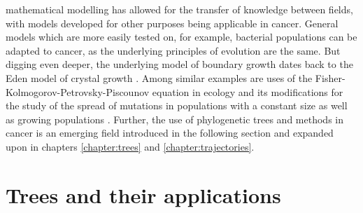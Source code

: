 mathematical modelling has allowed for the transfer of knowledge between fields, with models developed for
other purposes being applicable in cancer. General models which are more easily tested on, for example, bacterial
populations \cite{fusco_excess_2016, schreck_impact_2023} can be adapted to cancer, as the underlying principles
of evolution are the same. But digging even deeper, the underlying model of boundary growth dates back to the
Eden model of crystal growth \cite{eden_two-dimensional_1961}. Among similar examples are uses of the
Fisher-Kolmogorov-Petrovsky-Piscounov equation in ecology and its modifications for the study of the spread
of mutations in populations with a constant size \cite{houchmandzadeh_fisher_2017} as well as growing populations
\cite{wodarz_mutant_2020}.
Further, the use of phylogenetic trees and methods in cancer is an emerging field
introduced in the following section and expanded upon in chapters \ref{chapter:trees} and \ref{chapter:trajectories}.


\section{Trees and their applications}

